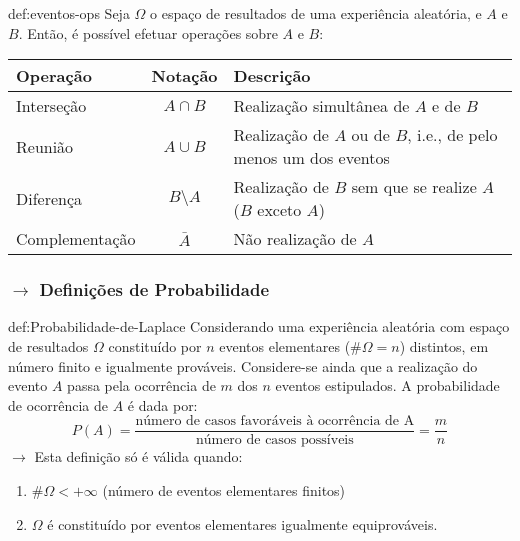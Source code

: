 \newpage
\begin{theo}{def:eventos-ops}\label{def:eventos-ops}
    Seja $\Omega$ o espaço de resultados de uma experiência aleatória, e $A$ e $B$. Então, é possível efetuar operações sobre $A$ e $B$:

    \vspace{1em}
    {
    \setlength{\tabcolsep}{16pt}
    \renewcommand{\arraystretch}{1.25}
    \noindent
    \begin{tabularx}{\linewidth}{ l c X }
        \toprule
        \textbf{Operação} & \textbf{Notação} & \textbf{Descrição} \\
        \midrule
        Interseção & $A \cap B$ & Realização simultânea de $A$ e de $B$ \\
        Reunião & $A \cup B$ & Realização de $A$ ou de $B$, i.e., de pelo menos um dos eventos \\
        Diferença & $B \setminus A$ & Realização de $B$ sem que se realize $A$ ($B$ exceto $A$) \\
        Complementação & $\bar{A}$ & Não realização de $A$ \\
        \bottomrule
    \end{tabularx}
    }
\end{theo}

\vspace{-1 em}
\subsubsection[1.1.2 Definições de Probabilidade]{$\pmb{\rightarrow}$ Definições de Probabilidade}

\begin{theo}{def:Probabilidade-de-Laplace}\label{def:Prob-Laplace}
    Considerando uma experiência aleatória com espaço de resultados $\Omega$ constituído por $n$ eventos elementares (\#$\Omega = n$) distintos, em número finito e igualmente prováveis. Considere-se ainda que a realização do evento $A$ passa pela ocorrência de $m$ dos $n$ eventos estipulados. A probabilidade de ocorrência de $A$ é dada por:
    $$
        P(A) = \dfrac{\text{número de casos favoráveis à ocorrência de A}}{\text{número de casos possíveis}} = \dfrac{m}{n}
    $$
    $\pmb{\rightarrow}$ Esta definição só é válida quando:

    \vspace{-1 em}
    \begin{enumerate}[label=$\bullet$]
        \item $\#\Omega < +\infty$ (número de eventos elementares finitos)
        \item $\Omega$ é constituído por eventos elementares igualmente equiprováveis.
    \end{enumerate}
\end{theo}

